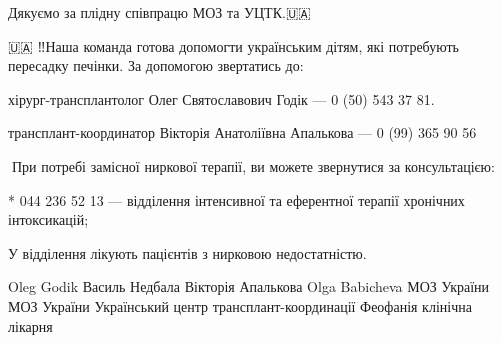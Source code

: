 Дякуємо за плідну співпрацю МОЗ та УЦТК.🇺🇦

🇺🇦 ‼️Наша команда готова допомогти українським дітям, які потребують пересадку
печінки. За допомогою звертатись до:

хірург-трансплантолог Олег Святославович Годік — 0 (50) 543 37 81.

трансплант-координатор Вікторія Анатоліївна Апалькова — 0 (99) 365 90 56

🔻При потребі замісної ниркової терапії, ви можете звернутися за консультацією:

* 044 236 52 13 — відділення інтенсивної та еферентної терапії хронічних інтоксикацій;

У відділення лікують пацієнтів з нирковою недостатністю.

Oleg Godik Василь Недбала Вікторія Апалькова Olga Babicheva МОЗ України МОЗ
України Український центр трансплант-координації Феофанія клінічна лікарня

